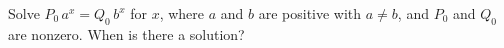 Solve $P_0\,a^x=Q_0\,b^x$ for $x$, where $a$ and $b$ are positive with $a\ne b$, and $P_0$ and $Q_0$ are nonzero. When is there a solution?
